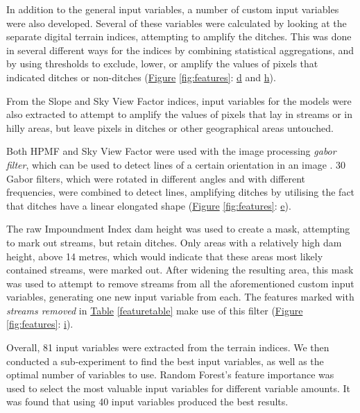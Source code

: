 \documentclass[]{interact}
\theoremstyle{plain}%
\theoremstyle{definition}
\theoremstyle{remark}
\begin{document}
In addition to the general input variables, a number of custom input variables were also developed. Several of these variables were calculated by looking at the separate digital terrain indices, attempting to amplify the ditches. This was done in several different ways for the indices by combining statistical aggregations, and by using thresholds to exclude, lower, or amplify the values of pixels that indicated ditches or non-ditches (\hyperref[fig:features]{Figure} \ref{fig:features}: \hyperref[fig:features]{d} and \hyperref[fig:features]{h}).

From the Slope and Sky View Factor indices, input variables for the models were also extracted to attempt to amplify the values of pixels that lay in streams or in hilly areas, but leave pixels in ditches or other geographical areas untouched.

Both HPMF and Sky View Factor were used with the image processing \textit{gabor filter}, which can be used to detect lines of a certain orientation in an image \citep{gabor}. 30 Gabor filters, which were rotated in different angles and with different frequencies, were combined to detect lines, amplifying ditches by utilising the fact that ditches have a linear elongated shape (\hyperref[fig:features]{Figure} \ref{fig:features}: \hyperref[fig:features]{e}).

\label{impoundmentstreamremoval}
The raw Impoundment Index dam height was used to create a mask, attempting to mark out streams, but retain ditches. Only areas with a relatively high dam height, above 14 metres, which would indicate that these areas most likely contained streams, were marked out. After widening the resulting area, this mask was used to attempt to remove streams from all the aforementioned custom input variables, generating one new input variable from each. The features marked with \textit{streams removed} in \hyperref[featuretable]{Table} \ref{featuretable} make use of this filter (\hyperref[fig:features]{Figure} \ref{fig:features}: \hyperref[fig:features]{i}).

Overall, 81 input variables were extracted from the terrain indices. We then conducted a sub-experiment to find the best input variables, as well as the optimal number of variables to use. Random Forest's feature importance was used to select the most valuable input variables for different variable amounts. It was found that using 40 input variables produced the best results.
\end{document}
